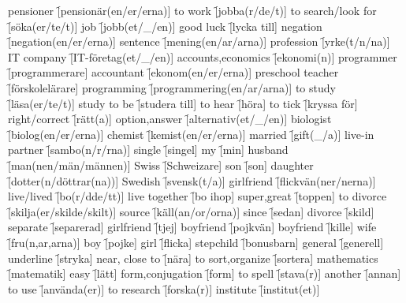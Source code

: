 \begin{questions}
\begin{multicols}{2}
        \question pensioner \f[pensionär(en/er/erna)]
        \question to work \f[jobba(r/de/t)]
        \question to search/look for \f[söka(er/te/t)]
        \question job \f[jobb(et/\_/en)]
        \question good luck \f[lycka till]
        \question negation \f[negation(en/er/erna)]
        \question sentence \f[mening(en/ar/arna)]
        \question profession \f[yrke(t/n/na)]
        \question IT company \f[IT-företag(et/\_/en)]
        \question accounts,economics \f[ekonomi(n)]
        \question programmer \f[programmerare]
        \question accountant \f[ekonom(en/er/erna)]
        \question preschool teacher \f[förskolelärare]
        \question programming \f[programmering(en/ar/arna)]
        \question to study \f[läsa(er/te/t)]
        \question study to be \f[studera till]
        \question to hear \f[höra]
        \question to tick \f[kryssa för]
        \question right/correct \f[rätt(a)]
        \question option,answer \f[alternativ(et/\_/en)]
        \question biologist \f[biolog(en/er/erna)]
        \question chemist \f[kemist(en/er/erna)]
        \question married \f[gift(\_/a)]
        \question live-in partner \f[sambo(n/r/rna)]
        \question single \f[singel]
        \question my \f[min]
        \question husband \f[man(nen/män/männen)]
        \question Swiss \f[Schweizare]
        \question son \f[son]
        \question daughter \f[dotter(n/döttrar(na))]
        \question Swedish \f[svensk(t/a)]
        \question girlfriend \f[flickvän(ner/nerna)]
        \question live/lived \f[bo(r/dde/tt)]
        \question live together \f[bo ihop]
        \question super,great \f[toppen]
        \question to divorce \f[skilja(er/skilde/skilt)]
        \question source \f[käll(an/or/orna)]
        \question since \f[sedan]
        \question divorce \f[skild]
        \question separate \f[separerad]
        \question girlfriend \f[tjej]
        \question boyfriend \f[pojkvän]
        \question boyfriend \f[kille]
        \question wife \f[fru(n,ar,arna)]
        \question boy \f[pojke]
        \question girl \f[flicka]
        \question stepchild \f[bonusbarn]
        \question general \f[generell]
        \question underline \f[stryka]
        \question near, close to \f[nära]
        \question to sort,organize \f[sortera]
        \question mathematics \f[matematik]
        \question easy \f[lätt]
        \question form,conjugation \f[form]
        \question to spell \f[stava(r)]
        \question another \f[annan]
        \question to use \f[använda(er)]
        \question to research \f[forska(r)]
        \question institute \f[institut(et)]
    \end{multicols}
\end{questions}
